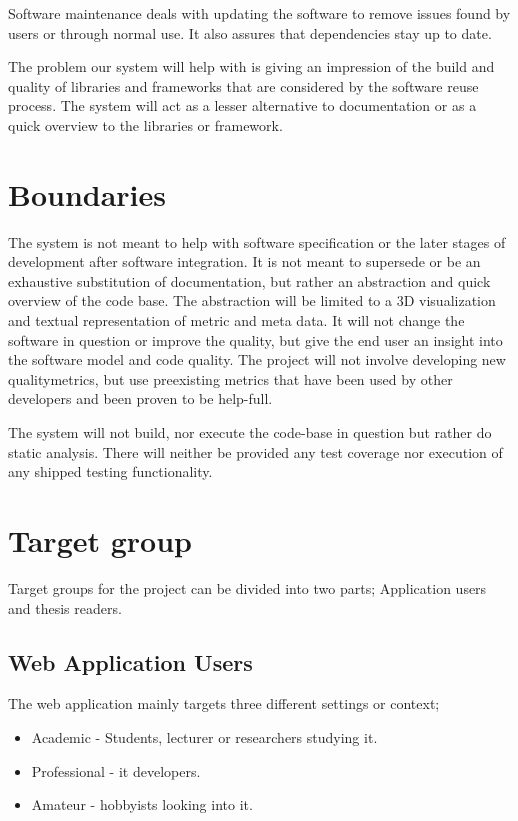 Software maintenance deals with updating the software to remove issues found by users or through normal use. It also assures that dependencies stay up to date.

The problem our system will help with is giving an impression of the build and quality of libraries and frameworks that are considered by the software reuse process. The system will act as a lesser alternative to documentation or as a quick overview to the libraries or framework.

\section{Boundaries}
The system is not meant to help with software specification or the later stages of development after software integration. It is not meant to supersede or be an exhaustive substitution of documentation, but rather an abstraction and quick overview of the code base. The abstraction will be limited to a 3D visualization and textual representation of metric and meta data. It will not change the software in question or improve the quality, but give the end user an insight into the software model and code quality. 
The project will not involve developing new \glspl{qualitymetric}, but use preexisting metrics that have been used by other developers and been proven to be help-full.

The system will not build, nor execute the code-base in question but rather do static analysis. There will neither be provided any test coverage nor execution of any shipped testing functionality.

\section{Target group}
Target groups for the project can be divided into two parts; Application users and thesis readers.

\subsection{Web Application Users}
The web application mainly targets three different settings or context;
\begin{itemize}
    \item Academic - Students, lecturer or researchers studying \gls{it}. 
    \item Professional - \gls{it} developers.
    \item Amateur - hobbyists looking into \gls{it}.
\end{itemize}

